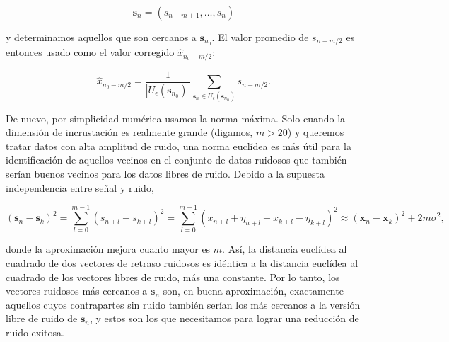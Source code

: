 \documentclass[10pt,a4paper]{book}
\begin{document}
\[
\mathbf{s}_n = (s_{n-m+1}, \ldots, s_n)
\]

y determinamos aquellos que son cercanos a $\mathbf{s}_{n_0}$. El valor promedio de $s_{n-m/2}$ es entonces usado como el valor corregido $\hat{x}_{n_0-m/2}$: 

\begin{equation}
\hat{x}_{n_0-m/2} = \frac{1}{|U_\epsilon(\mathbf{s}_{n_0})|} \sum_{\mathbf{s}_n \in U_\epsilon(\mathbf{s}_{n_0})} s_{n-m/2}.
\end{equation}

De nuevo, por simplicidad numérica usamos la norma máxima. Solo cuando la dimensión de incrustación es realmente grande (digamos, $m > 20$) y queremos tratar datos con alta amplitud de ruido, una norma euclídea es más útil para la identificación de aquellos vecinos en el conjunto de datos ruidosos que también serían buenos vecinos para los datos libres de ruido. Debido a la supuesta independencia entre señal y ruido,

\begin{equation}
(\mathbf{s}_n - \mathbf{s}_k)^2 = \sum_{l=0}^{m-1} (s_{n+l} - s_{k+l})^2 = \sum_{l=0}^{m-1} (x_{n+l} + \eta_{n+l} - x_{k+l} - \eta_{k+l})^2 \approx (\mathbf{x}_n - \mathbf{x}_k)^2 + 2m\sigma^2,
\end{equation}

donde la aproximación mejora cuanto mayor es $m$. Así, la distancia euclídea al cuadrado de dos vectores de retraso ruidosos es idéntica a la distancia euclídea al cuadrado de los vectores libres de ruido, más una constante. Por lo tanto, los vectores ruidosos más cercanos a $\mathbf{s}_n$ son, en buena aproximación, exactamente aquellos cuyos contrapartes sin ruido también serían los más cercanos a la versión libre de ruido de $\mathbf{s}_n$, y estos son los que necesitamos para lograr una reducción de ruido exitosa.

\bigskip
\end{document}
